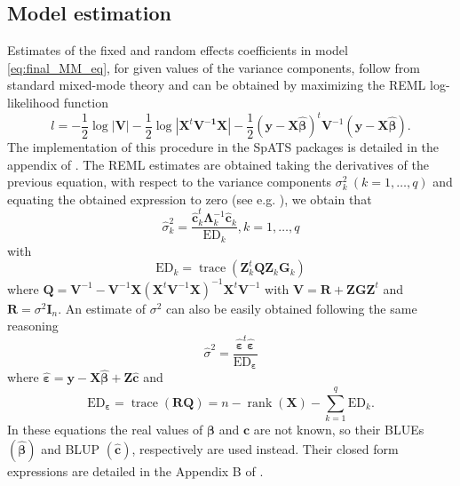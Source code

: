 \subsection{Model estimation}
Estimates of the fixed and random effects coefficients in model \ref{eq:final_MM_eq}, for given values of the variance components, follow from standard mixed-mode theory and can be obtained by maximizing the REML log-likelihood function
\begin{equation}
    l=-\frac{1}{2} \log |\boldsymbol{V}|-\frac{1}{2} \log \left|\boldsymbol{X}^{t} \boldsymbol{V}^{-\mathbf{1}} \boldsymbol{X}\right|-\frac{1}{2}(\boldsymbol{y}-\boldsymbol{X} \widehat{\boldsymbol{\beta}})^{t} \boldsymbol{V}^{-1}(\boldsymbol{y}-\boldsymbol{X} \widehat{\boldsymbol{\beta}})
    \text{.}
\end{equation}
The implementation of this procedure in the SpATS packages is detailed in the appendix of \textcite{rodriguez2016spatial}. The REML estimates are obtained taking the derivatives of the previous equation, with respect to the variance components $\sigma_k^2 \ (k=1,\ldots,q)$ and equating the obtained expression to zero (see e.g. \cite{rodriguez2015fast,johnson1995restricted}), we obtain that
\begin{equation}
    \widehat{\sigma}_{k}^{2}=\frac{\widehat{\mathbf{c}}_{k}^{t} \boldsymbol{\Lambda}_{k}^{-1} \widehat{\mathbf{c}}_{k}}{\mathrm{ED}_{k}}, k=1, \ldots, q
\end{equation}
with
\begin{equation}
    \mathrm{ED}_{k}=\operatorname{trace}\left(\mathbf{Z}_{k}^{t} \mathbf{Q} \mathbf{Z}_{k} \mathbf{G}_{k}\right)
\end{equation}
where $\mathbf{Q}=\boldsymbol{V}^{-1}-\boldsymbol{V}^{-1} \boldsymbol{X}\left(\boldsymbol{X}^{t} \boldsymbol{V}^{-1} \boldsymbol{X}\right)^{-1} \boldsymbol{X}^{t} \boldsymbol{V}^{-1}$ with $\boldsymbol{V}=\boldsymbol{R}+\mathbf{Z}\boldsymbol{G} \mathbf{Z}^{t}$ and $\boldsymbol{R}=\sigma^{2} \boldsymbol{I}_{n}$. An estimate of $\sigma^2$ can also be easily obtained following the same reasoning
\begin{equation}
    \widehat{\sigma}^{2}=\frac{\widehat{\boldsymbol{\varepsilon}}^{t} \hat{\boldsymbol{\varepsilon}}}{\mathrm{ED}_{\boldsymbol{\varepsilon}}}
    \label{eq:var_estimation_SPATS}
\end{equation}
where $\widehat{\boldsymbol{\varepsilon}}=\mathbf{y}-\mathbf{X} \widehat{\boldsymbol{\beta}}+\mathbf{Z} \widehat{\mathbf{c}}$ and
\begin{equation}
    \mathrm{ED}_{\boldsymbol{\varepsilon}}=\operatorname{trace}(\mathbf{R Q})=n-\operatorname{rank}(\mathbf{X})-\sum_{k=1}^{q} \mathrm{ED}_{k}
    \text{.}
    \label{eq:ED_error_term}
\end{equation}
In these equations the real values of $\boldsymbol{\beta}$ and $\mathbf{c}$ are not known, so their BLUEs $(\widehat{\boldsymbol{\beta}})$ and BLUP $(\hat{\mathbf{c}})$, respectively are used instead. Their closed form expressions are detailed in the Appendix B of \textcite{rodriguez2016spatial}.


